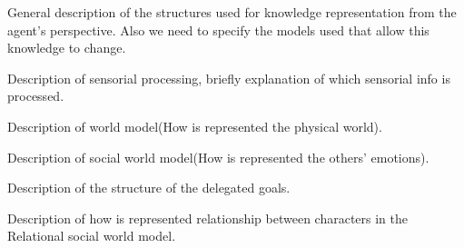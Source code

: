 
General description of the structures used for knowledge representation from the agent's perspective. Also we need to specify the models used that allow this knowledge to change.

Description of sensorial processing, briefly explanation of which sensorial info is processed.

Description of world model(How is represented the physical world).

Description of social world model(How is represented the others' emotions).

Description of the structure of the delegated goals.

Description of how is represented relationship between characters in the Relational social world model.